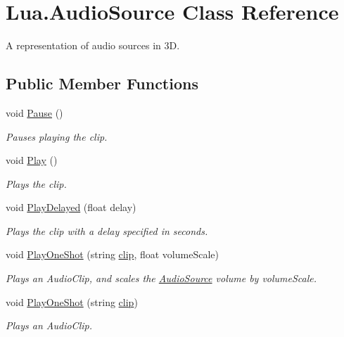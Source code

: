\hypertarget{class_lua_1_1_audio_source}{}\section{Lua.\+Audio\+Source Class Reference}
\label{class_lua_1_1_audio_source}


A representation of audio sources in 3D.  


\subsection*{Public Member Functions}
\begin{DoxyCompactItemize}
\item 
void \mbox{\hyperlink{class_lua_1_1_audio_source_aad8aea6c6f265dfe440a6a8620416bf4}{Pause}} ()
\begin{DoxyCompactList}\small\item\em Pauses playing the clip. \end{DoxyCompactList}\item 
void \mbox{\hyperlink{class_lua_1_1_audio_source_aef1a519a4611e2aa72570d113d92c904}{Play}} ()
\begin{DoxyCompactList}\small\item\em Plays the clip. \end{DoxyCompactList}\item 
void \mbox{\hyperlink{class_lua_1_1_audio_source_a10ba6ce0794c8050458466082302bc09}{Play\+Delayed}} (float delay)
\begin{DoxyCompactList}\small\item\em Plays the clip with a delay specified in seconds. \end{DoxyCompactList}\item 
void \mbox{\hyperlink{class_lua_1_1_audio_source_ac8a51a95f2285660337ddf45fd10252e}{Play\+One\+Shot}} (string \mbox{\hyperlink{class_lua_1_1_audio_source_a4913b6f1fa8dfe5eb528cd7e40f91684}{clip}}, float volume\+Scale)
\begin{DoxyCompactList}\small\item\em Plays an Audio\+Clip, and scales the \mbox{\hyperlink{class_lua_1_1_audio_source}{Audio\+Source}} volume by volume\+Scale. \end{DoxyCompactList}\item 
void \mbox{\hyperlink{class_lua_1_1_audio_source_a404e19781f62fa9186ecdcf535e7d4ae}{Play\+One\+Shot}} (string \mbox{\hyperlink{class_lua_1_1_audio_source_a4913b6f1fa8dfe5eb528cd7e40f91684}{clip}})
\begin{DoxyCompactList}\small\item\em Plays an Audio\+Clip. \end{DoxyCompactList}\item 

\end{DoxyCompactItemize}
